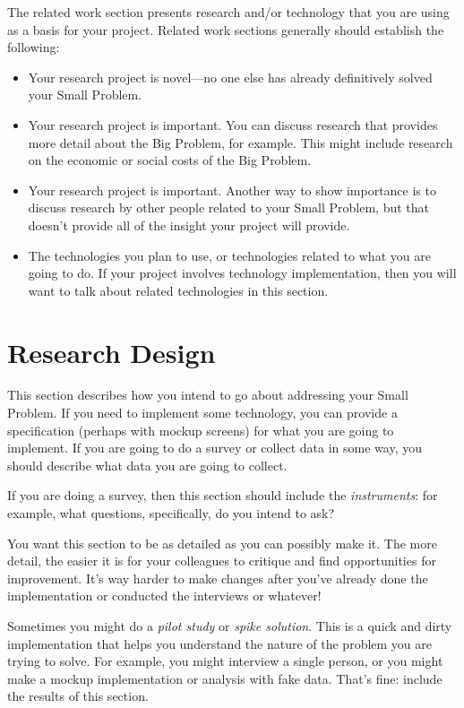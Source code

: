 \documentclass[english]{proposalnsf}
\begin{document}
The related work section presents research and/or technology that you are using as a basis for your project.  Related work sections generally should establish the following:

\begin{itemize}
\item Your research project is novel---no one else has already definitively solved your Small Problem.
\item Your research project is important. You can discuss research that provides more detail about the Big Problem, for example. This might include research on the economic or social costs of the Big Problem.
\item Your research project is important.  Another way to show importance is to discuss research by other people related to your Small Problem, but that doesn't provide all of the insight your project will provide.
\item The technologies you plan to use, or technologies related to what you are going to do. If your project involves technology implementation, then you will want to talk about related technologies in this section.
\end{itemize}

\section{Research Design}
\label{research-design}

This section describes how you intend to go about addressing your Small Problem.  If you need to implement some technology, you can provide a specification (perhaps with mockup screens) for what you are going to implement. If you are going to do a survey or collect data in some way, you should describe what data you are going to collect.

If you are doing a survey, then this section should include the {\em instruments}:  for example, what questions, specifically, do you intend to ask?

You want this section to be as detailed as you can possibly make it.  The more detail, the easier it is for your colleagues to critique and find opportunities for improvement.   It's way harder to make changes after you've already done the implementation or conducted the interviews or whatever!

Sometimes you might do a {\em pilot study} or {\em spike solution}.  This is a quick and dirty implementation that helps you understand the nature of the problem you are trying to solve.  For example, you might interview a single person, or you might make a mockup implementation or analysis with fake data.  That's fine: include the results of this section.
\end{document}
